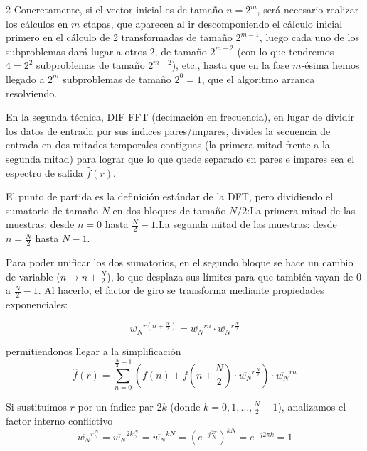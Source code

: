 \documentclass[10pt]{article}
\begin{document}
\begin{multicols}{2}
Concretamente, si el vector inicial es de tamaño $n = 2^m$, será necesario realizar los cálculos en $m$ etapas, que aparecen al ir descomponiendo el cálculo inicial primero en el cálculo de 2 transformadas de tamaño $2^{m-1}$, luego cada uno de los subproblemas dará lugar a otros 2, de tamaño $2^{m-2}$ (con lo que tendremos $4 = 2^2$ subproblemas de tamaño $2^{m-2}$), etc., hasta que en la fase $m$-ésima hemos llegado a $2^m$ subproblemas de tamaño $2^0 = 1$, que el algoritmo arranca resolviendo.


En la segunda técnica, DIF FFT (decimación en frecuencia), en lugar de dividir los datos de entrada por sus índices pares/impares, divides la secuencia de entrada en dos mitades temporales contiguas (la primera mitad frente a la segunda mitad) para lograr que lo que quede separado en pares e impares sea el espectro de salida $\widehat{f}(r)$. 

El punto de partida es la definición estándar de la DFT, pero dividiendo el sumatorio de tamaño $N$ en dos bloques de tamaño $N/2$:La primera mitad de las muestras: desde $n = 0$ hasta $\frac{N}{2} - 1$.La segunda mitad de las muestras: desde $n = \frac{N}{2}$ hasta $N - 1$.

Para poder unificar los dos sumatorios, en el segundo bloque se hace un cambio de variable ($n \to n + \frac{N}{2}$), lo que desplaza sus límites para que también vayan de $0$ a $\frac{N}{2}-1$. Al hacerlo, el factor de giro se transforma mediante propiedades exponenciales:

\begin{equation}
\overline{w_N}^{r\left(n + \frac{N}{2}\right)} = \overline{w_N}^{rn} \cdot \overline{w_N}^{r\frac{N}{2}}
\end{equation}

permitiendonos llegar a la simplificación 
 \begin{equation}
\widehat{f}(r) = \sum_{n=0}^{\frac{N}{2}-1} \left( f(n) + f\left(n + \frac{N}{2}\right) \cdot \overline{w_N}^{r\frac{N}{2}} \right) \cdot \overline{w_N}^{rn}  
 \end{equation}

Si sustituimos $r$ por un índice par $2k$ (donde $k = 0, 1, \dots, \frac{N}{2}-1$), analizamos el factor interno conflictivo
\begin{equation}
\overline{w_N}^{r\frac{N}{2}} = \overline{w_N}^{2k\frac{N}{2}} = \overline{w_N}^{kN} = \left(e^{-j\frac{2\pi}{N}}\right)^{kN} = e^{-j2\pi k} = 1
\end{equation}


\end{multicols}
\end{document}
